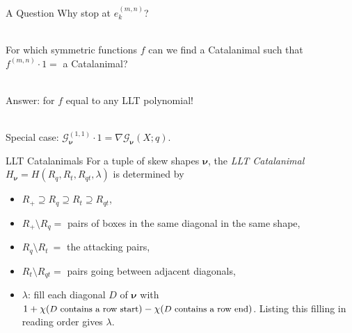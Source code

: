 \documentclass[dvipsnames]{beamer}
\newcommand{\Gcal}{{\mathcal G}}
\newcommand{\nubold}{{\boldsymbol \nu }}
\theoremstyle{definition}
\newcounter{c}
\begin{document}
\begin{frame}{A Question}
  Why stop at \(e_k^{(m,n)}\)? \pause

  \ \\
  
  For which symmetric functions \(f\) can we find a Catalanimal such
  that \(f^{(m,n)} \cdot 1 = \) a Catalanimal? \pause

  \ \\

  Answer: for \(f\) equal to any LLT polynomial! \pause

  \ \\
  Special case: \(\Gcal_\nubold^{(1,1)} \cdot 1 = \nabla
  \Gcal_\nubold(X;q)\).
\end{frame}
\begin{frame}{LLT Catalanimals}
  For a tuple of skew shapes $\nubold$, the \emph{LLT Catalanimal} $H_{\nubold} = H(R_q,R_t, R_{qt}, \lambda)$
is determined by
\vspace{1mm}
\begin{itemize}
\item $R_+ \supseteq R_q \supseteq R_t \supseteq R_{qt}$,\pause
\item $R_+ \setminus R_q = $ pairs of boxes in the same diagonal in
  the same shape,
\item $R_q \setminus R_t \ = $ the attacking pairs,
\item  $R_t \setminus R_{qt}  = $ pairs going between adjacent diagonals,\pause
\item $\lambda$: fill each diagonal $D$ of $\nubold$ with
$1+\chi({\small \text{$D$ contains a row start}}) - \chi({\small \text{$D$ contains a row end}})$. \break
Listing this filling in reading order gives  $\lambda$.
\end{itemize}
\end{frame}
\end{document}
